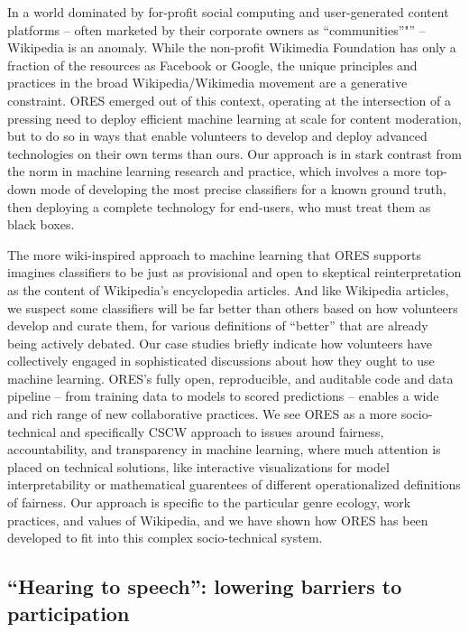 In a world dominated by for-profit social computing and user-generated content platforms -- often marketed by their corporate owners as ``communities''"'' -- \cite{gillespie2018custodians} Wikipedia is an anomaly. While the non-profit Wikimedia Foundation has only a fraction of the resources as Facebook or Google, the unique principles and practices in the broad Wikipedia/Wikimedia movement are a generative constraint. ORES emerged out of this context, operating at the intersection of a pressing need to deploy efficient machine learning at scale for content moderation, but to do so in ways that enable volunteers to develop and deploy advanced technologies on their own terms than ours. Our approach is in stark contrast from the norm in machine learning research and practice, which involves a more top-down mode of developing the most precise classifiers for a known ground truth, then deploying a complete technology for end-users, who must treat them as black boxes.

The more wiki-inspired approach to machine learning that ORES supports imagines classifiers to be just as provisional and open to skeptical reinterpretation as the content of Wikipedia's encyclopedia articles. And like Wikipedia articles, we suspect some classifiers will be far better than others based on how volunteers develop and curate them, for various definitions of ``better'' that are already being actively debated. Our case studies briefly indicate how volunteers have collectively engaged in sophisticated discussions about how they ought to use machine learning. ORES's fully open, reproducible, and auditable code and data pipeline -- from training data to models to scored predictions -- enables a wide and rich range of new collaborative practices. We see ORES as a more socio-technical and specifically CSCW approach to issues around fairness, accountability, and transparency in machine learning, where much attention is placed on technical solutions, like interactive visualizations for model interpretability or mathematical guarentees of different operationalized definitions of fairness. Our approach is specific to the particular genre ecology, work practices, and values of Wikipedia, and we have shown how ORES has been developed to fit into this complex socio-technical system.

\subsection{``Hearing to speech'': lowering barriers to participation}

